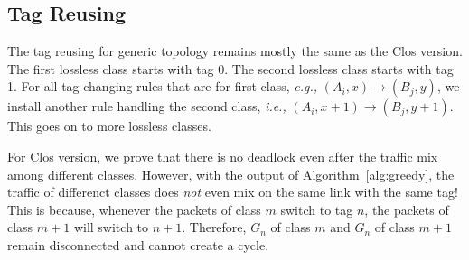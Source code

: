 \subsection{Tag Reusing}

The tag reusing for generic topology remains mostly the same as the Clos version.
The first lossless class starts with tag 0. The second lossless class starts with 
tag 1. For all tag changing rules that are for first class, {\em e.g.,} 
$(A_i, x)\rightarrow(B_j, y)$, we install another rule handling the second class,
{\em i.e.,} $(A_i, x+1)\rightarrow(B_j, y+1)$. This goes on to more lossless classes.

For Clos version, we prove that there is no deadlock even after the traffic mix among
different classes. However, with the output of Algorithm~\ref{alg:greedy}, the traffic
of differenct classes does {\em not} even mix on the same link with the same tag!
This is because, whenever the packets of class $m$ switch to tag $n$,  the packets of
class $m+1$ will switch to $n+1$. Therefore, $G_n$ of class $m$ and $G_n$ of class $m+1$
remain disconnected and cannot create a cycle.

